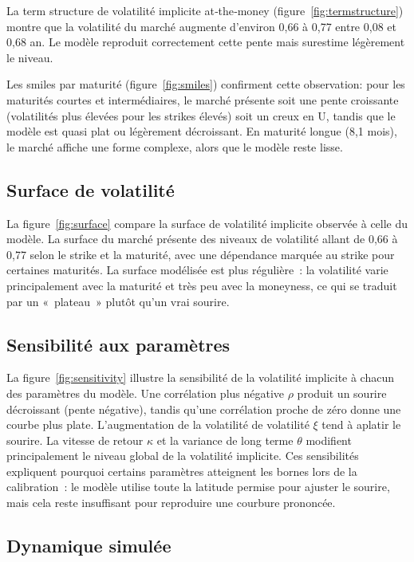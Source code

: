 \documentclass[12pt,a4paper]{article}
\begin{document}
La term structure de volatilité implicite at‑the‑money (figure~\ref{fig:termstructure}) montre que la volatilité du marché augmente d'environ 0,66 à 0,77 entre 0,08 et 0,68 an.  Le modèle reproduit correctement cette pente mais surestime légèrement le niveau.  

Les smiles par maturité (figure~\ref{fig:smiles}) confirment cette observation: pour les maturités courtes et intermédiaires, le marché présente soit une pente croissante (volatilités plus élevées pour les strikes élevés) soit un creux en U, tandis que le modèle est quasi plat ou légèrement décroissant.  En maturité longue (8,1 mois), le marché affiche une forme complexe, alors que le modèle reste lisse.

\subsection{Surface de volatilité}

La figure~\ref{fig:surface} compare la surface de volatilité implicite observée à celle du modèle.  La surface du marché présente des niveaux de volatilité allant de 0,66 à 0,77 selon le strike et la maturité, avec une dépendance marquée au strike pour certaines maturités.  La surface modélisée est plus régulière : la volatilité varie principalement avec la maturité et très peu avec la moneyness, ce qui se traduit par un « plateau » plutôt qu'un vrai sourire.

\subsection{Sensibilité aux paramètres}

La figure~\ref{fig:sensitivity} illustre la sensibilité de la volatilité implicite à chacun des paramètres du modèle.  Une corrélation plus négative $\rho$ produit un sourire décroissant (pente négative), tandis qu'une corrélation proche de zéro donne une courbe plus plate.  L'augmentation de la volatilité de volatilité $\xi$ tend à aplatir le sourire.  La vitesse de retour $\kappa$ et la variance de long terme $\theta$ modifient principalement le niveau global de la volatilité implicite.  Ces sensibilités expliquent pourquoi certains paramètres atteignent les bornes lors de la calibration : le modèle utilise toute la latitude permise pour ajuster le sourire, mais cela reste insuffisant pour reproduire une courbure prononcée.

\subsection{Dynamique simulée}
\end{document}
